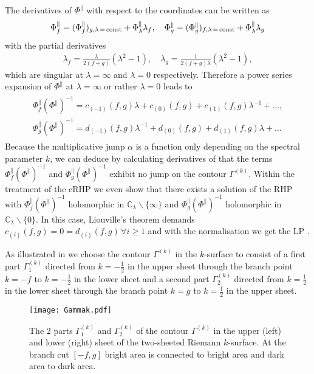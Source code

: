 \documentclass[12pt]{iopart}
\begin{document}
The derivatives of ${\Phi}^\|$ with respect to the coordinates can be written as
\begin{eqnarray} 
 {\Phi}^\|_f=({\Phi}^\|_f)_{g,\lambda\,=\,{\rm const}}+{\Phi}^\|_{\lambda}\lambda_f, \quad 
 {\Phi}^\|_g=({\Phi}^\|_g)_{f,\lambda\,=\,{\rm const}}+{\Phi}^\|_{\lambda}\lambda_g
\end{eqnarray}
with the partial derivatives
\begin{eqnarray} 
 \lambda_f=\frac{\lambda}{2(f+g)}(\lambda^2-1), \quad \lambda_g=\frac{1}{2(f+g)\lambda}(\lambda^2-1),
\end{eqnarray}
which are singular at $\lambda=\infty$ and $\lambda=0$ respectively. Therefore a power series   expansion of ${\Phi}^\|$ at $\lambda=\infty$ or rather $\lambda=0$ leads to 
\begin{eqnarray} 
\begin{array}{c} %
{\Phi}^\|_f({\Phi}^\|)^{-1}=c_{(-1)}(f,g)\lambda+c_{(0)}(f,g)+c_{(1)}(f,g)\lambda^{-1}+\dots, \\
{\Phi}^\|_g({\Phi}^\|)^{-1}=d_{(-1)}(f,g)\lambda^{-1}+d_{(0)}(f,g)+d_{(1)}(f,g)\lambda+\dots
\end{array}
\end{eqnarray}
Because the multiplicative jump $\alpha$ is a function only depending on the spectral parameter $k$, we can deduce by calculating derivatives of  that the terms ${\Phi}^\|_f({\Phi}^\|)^{-1}$ and ${\Phi}^\|_g({\Phi}^\|)^{-1}$ exhibit no jump on the contour $\Gamma^{(k)}$. Within the treatment of the cRHP we even show that there exists a solution of the RHP with ${\Phi}^\|_f({\Phi}^\|)^{-1}$ holomorphic in $\mathbb{C}_{\lambda}\backslash\{\infty\}$ and ${\Phi}^\|_g({\Phi}^\|)^{-1}$ holomorphic in $\mathbb{C}_{\lambda}\backslash\{0\}$. In this case, Liouville's theorem demands $c_{(i)}(f,g)=0=d_{(i)}(f,g) \,\forall i\geq 1$ and with the normalisation  we get the LP .

As illustrated in  we choose the contour $\Gamma^{(k)}$ in the $k$-surface to consist of a first part $\Gamma^{(k)}_1$ directed from $k=-\frac12$ in the upper sheet through the branch point $k=-f$ to $k=-\frac12$ in the lower sheet and a second part $\Gamma^{(k)}_2$ directed from $k=\frac12$ in the lower sheet through the branch point $k=g$ to $k=\frac12$ in the upper sheet.

\begin{figure}[ht!]
\centering
\texttt{[image: Gammak.pdf]}
\caption{The 2 parts $\Gamma^{(k)}_1$ and $\Gamma^{(k)}_2$ of the contour $\Gamma^{(k)}$ in the upper (left) and lower (right) sheet of the two-sheeted Riemann $k$-surface. At the branch cut $[-f,g]$ bright area is connected to bright area and dark area to dark area.}
\label{Konturk}
\end{figure} 
\end{document}
